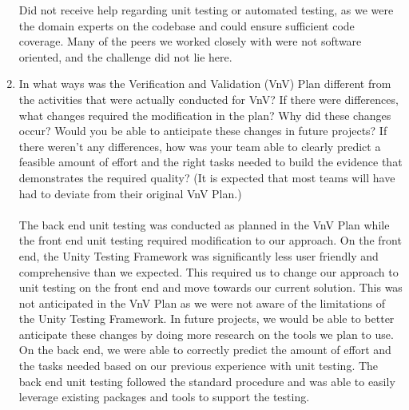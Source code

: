 \documentclass[12pt, titlepage]{article}
\begin{document}
\begin{enumerate}
  Did not receive help regarding unit testing or automated testing, as we were the domain experts on the codebase and could ensure sufficient code coverage. Many of the peers we worked closely with were not software oriented, and the challenge did not lie here.

  \item In what ways was the Verification and Validation (VnV) Plan different
  from the activities that were actually conducted for VnV?  If there were
  differences, what changes required the modification in the plan?  Why did
  these changes occur?  Would you be able to anticipate these changes in future
  projects?  If there weren't any differences, how was your team able to clearly
  predict a feasible amount of effort and the right tasks needed to build the
  evidence that demonstrates the required quality?  (It is expected that most
  teams will have had to deviate from their original VnV Plan.)
  \\
  \\
  The back end unit testing was conducted as planned in the VnV Plan while the front end unit testing required modification to our approach.
  On the front end, the Unity Testing Framework was significantly less user friendly and comprehensive than we expected.
  This required us to change our approach to unit testing on the front end and move towards our current solution.
  This was not anticipated in the VnV Plan as we were not aware of the limitations of the Unity Testing Framework.
  In future projects, we would be able to better anticipate these changes by doing more research on the tools we plan to use.
  On the back end, we were able to correctly predict the amount of effort and the tasks needed based on our previous experience with unit testing.
  The back end unit testing followed the standard procedure and was able to easily leverage existing packages and tools to support the testing.
\end{enumerate}
\end{document}
